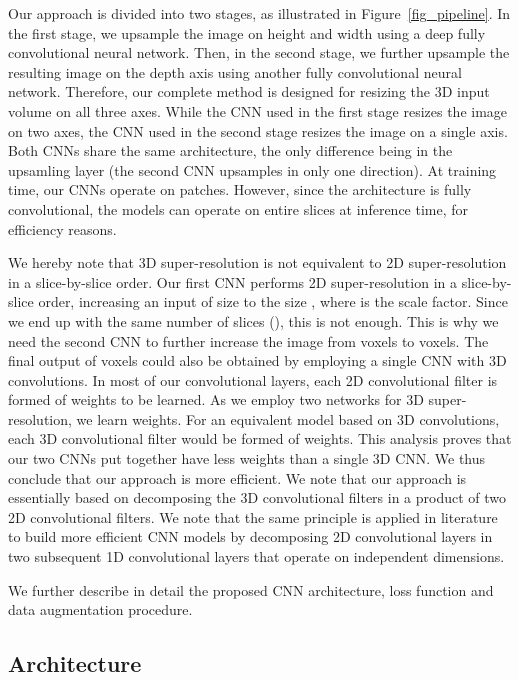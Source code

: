 \documentclass{ieeeaccess}
\begin{document}
Our approach is divided into two stages, as illustrated in Figure~\ref{fig_pipeline}. In the first stage, we upsample the image on height and width using a deep fully convolutional neural network. Then, in the second stage, we further upsample the resulting image on the depth axis using another fully convolutional neural network. Therefore, our complete method is designed for resizing the 3D input volume on all three axes. While the CNN used in the first stage resizes the image on two axes, the CNN used in the second stage resizes the image on a single axis. Both CNNs share the same architecture, the only difference being in the upsamling layer (the second CNN upsamples in only one direction). At training time, our CNNs operate on patches. However, since the architecture is fully convolutional, the models can operate on entire slices at inference time, for efficiency reasons.

We hereby note that 3D super-resolution is not equivalent to 2D super-resolution in a slice-by-slice order. Our first CNN performs 2D super-resolution in a slice-by-slice order, increasing an input of size  to the size , where  is the scale factor. Since we end up with the same number of slices (), this is not enough. This is why we need the second CNN to further increase the image from  voxels to  voxels. The final output of  voxels could also be obtained by employing a single CNN with 3D convolutions. In most of our convolutional layers, each 2D convolutional filter is formed of  weights to be learned. As we employ two networks for 3D super-resolution, we learn  weights. For an equivalent model based on 3D convolutions, each 3D convolutional filter would be formed of  weights. This analysis proves that our two CNNs put together have less weights than a single 3D CNN. We thus conclude that our approach is more efficient. We note that our approach is essentially based on decomposing the 3D convolutional filters in a product of two 2D convolutional filters. We note that the same principle is applied in literature \cite{Howard-arXiv-2017,Jaderberg-BMVC-2014} to build more efficient CNN models by decomposing 2D convolutional layers in two subsequent 1D convolutional layers that operate on independent dimensions.
 
We further describe in detail the proposed CNN architecture, loss function and data augmentation procedure.

\subsection{Architecture}
\end{document}

